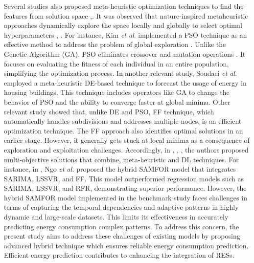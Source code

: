 \documentclass[journal]{IEEEtran}
\begin{document}
  
Several studies also proposed meta-heuristic optimization techniques to find the features from solution space \cite{RC1},\cite{RC2}. It was observed that nature-inspired metaheuristic approaches dynamically explore the space locally and globally to select optimal hyperparameters \cite{RC3}, \cite{RC4}. For instance, Kim \textit{et al}. implemented a PSO technique as an effective method to address the problem of global exploration \cite{Ref27}. Unlike the Genetic Algorithm (GA), PSO eliminates crossover and mutation operations \cite{Ref28}. It focuses on evaluating the fitness of each individual in an entire population, simplifying the optimization process. In another relevant study, Soudaei \textit{et al}. \cite{Ref29} employed a meta-heuristic DE-based technique to forecast the usage of energy in housing buildings. This technique includes operators like GA to change the behavior of PSO and the ability to converge faster at global minima. Other relevant study \cite{Ref25} showed that, unlike DE and PSO, FF technique, which automatically handles subdivisions and addresses multiple nodes, is an efficient optimization technique. The FF approach also identifies optimal solutions in an earlier stage. However, it generally gets stuck at local minima as a consequence of exploration and exploitation challenges. Accordingly, in \cite{Ref18}, \cite{ref16}, \cite{RC5}, the authors proposed multi-objective solutions that combine, meta-heuristic and DL techniques. For instance, in \cite{Ref}, Ngo \textit{et al.} proposed the hybrid SAMFOR model that integrates SARIMA, LSSVR, and FF. This model outperformed regression models such as SARIMA, LSSVR, and RFR, demonstrating superior performance. However, the hybrid SAMFOR model implemented in the benchmark study faces challenges in terms of capturing the temporal dependencies and adaptive patterns in highly dynamic and large-scale datasets. This limits its effectiveness in accurately predicting energy consumption complex patterns. To address this concern, the present study aims to address these challenges of existing models by proposing advanced hybrid technique which ensures reliable energy consumption prediction. Efficient energy prediction contributes to enhancing the integration of RESs.
\end{document}
